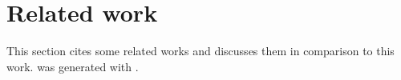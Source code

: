 \section{Related work}
\label{sec:related-work}

This section cites some related works and discusses them in comparison to this
work. \cite{bar-1490} was generated with \cite{kokkonis-2024}.

